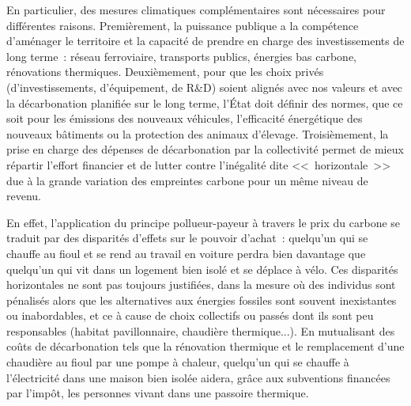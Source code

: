 \documentclass[a5paper,french]{memoir}
\begin{document}
En particulier, des mesures climatiques complémentaires sont nécessaires pour différentes raisons. Premièrement, la puissance publique a la compétence d'aménager le territoire et la capacité de prendre en charge des investissements de long terme~: réseau ferroviaire, transports publics, énergies bas carbone, rénovations thermiques. Deuxièmement, pour que les choix privés (d'investissements, d'équipement, de R\&D) soient alignés avec nos valeurs et avec la décarbonation planifiée sur le long terme, l'État doit définir des normes, que ce soit pour les émissions des nouveaux véhicules, l'efficacité énergétique des nouveaux bâtiments ou la protection des animaux d'élevage. Troisièmement, la prise en charge des dépenses de décarbonation par la collectivité permet de mieux répartir l'effort financier et de lutter contre l'inégalité dite <<~horizontale~>> due à la grande variation des empreintes carbone pour un même niveau de revenu. %

En effet, l'application du principe pollueur-payeur à travers le prix du carbone se traduit par des disparités d'effets sur le pouvoir d'achat~: quelqu'un qui se chauffe au fioul et se rend au travail en voiture perdra bien davantage que quelqu'un qui vit dans un logement bien isolé et se déplace à vélo. 
Ces disparités horizontales ne sont pas toujours justifiées, dans la mesure où des individus sont pénalisés alors que les alternatives aux énergies fossiles sont souvent inexistantes ou inabordables, et ce à cause de choix collectifs ou passés dont ils sont peu responsables (habitat pavillonnaire, chaudière thermique...). En mutualisant des coûts de décarbonation tels que la rénovation thermique et le remplacement d'une chaudière au fioul par une pompe à chaleur, quelqu'un qui se chauffe à l'électricité dans une maison bien isolée aidera, grâce aux subventions financées par l'impôt, les personnes vivant dans une passoire thermique. 
\end{document}
